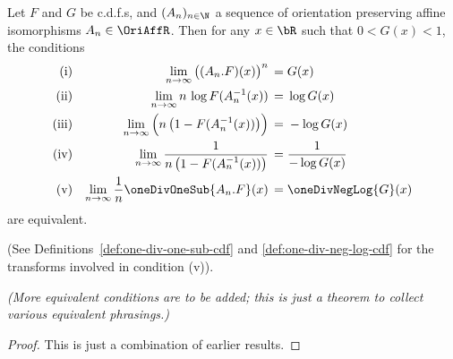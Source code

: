 

\begin{theorem}
  \label{thm:tfae-ev-limit}
  \leanok
  Let $F$ and $G$ be c.d.f.s, and $(A_n)_{n \in \N}$ a sequence of orientation
  preserving affine isomorphisms $A_n \in \OriAffR$. Then for any $x \in \bR$
  such that $0 < G(x) < 1$, the conditions
  \begin{align*}
    \text{(i)} & & \lim_{n \to \infty} \big( (A_n.F)(x) \big)^n \, = \; & G(x) \\
    \text{(ii)} & & \lim_{n \to \infty} n \, \log F (A_n^{-1}(x)) \, = \; & \log G(x) \\
    \text{(iii)} & & \lim_{n \to \infty} \Big( n \, \big(1 - F (A_n^{-1}(x)) \big) \Big)
      \, = \; & - \log G(x) \\
    \text{(iv)} & & \lim_{n \to \infty} \frac{1}{n \, \big(1 - F (A_n^{-1}(x)) \big)}
      \, = \; & \frac{1}{-\log G(x)} \\
    \text{(v)} & & \lim_{n \to \infty} \frac{1}{n} \oneDivOneSub{A_n . F} (x)
      \, = \; & \oneDivNegLog{G} (x)
  \end{align*}
  are equivalent.

  (See Definitions~\ref{def:one-div-one-sub-cdf}
  and \ref{def:one-div-neg-log-cdf} for the transforms involved in condition (v)).

  \emph{(More equivalent conditions are to be added; this is just a theorem to collect
  various equivalent phrasings.)}
\end{theorem}
\begin{proof}
  \leanok
  This is just a combination of earlier results.
\end{proof}

